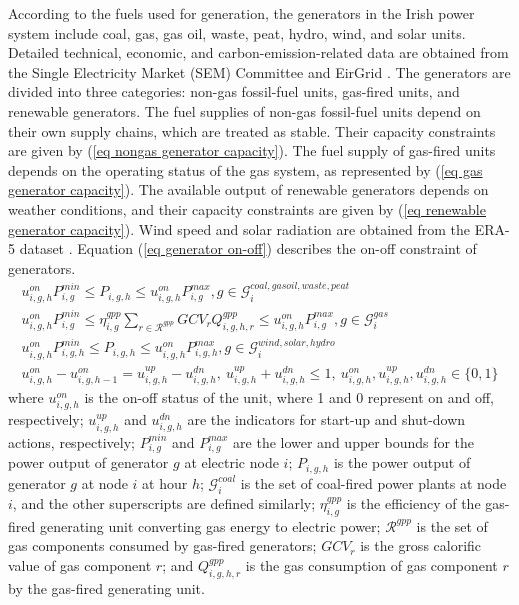 \documentclass[sn-mathphys,Numbered]{sn-jnl}%
\theoremstyle{plain}%
\theoremstyle{definition}%
\theoremstyle{remark}%
\begin{document}
According to the fuels used for generation, the generators in the Irish power system include coal, gas, gas oil, waste, peat, hydro, wind, and solar units. Detailed technical, economic, and carbon-emission-related data are obtained from the Single Electricity Market (SEM) Committee and EirGrid \cite{SEMPLEXOS, AllIslandTenYear}. The generators are divided into three categories: non-gas fossil-fuel units, gas-fired units, and renewable generators. The fuel supplies of non-gas fossil-fuel units depend on their own supply chains, which are treated as stable. Their capacity constraints are given by (\ref{eq nongas generator capacity}). The fuel supply of gas-fired units depends on the operating status of the gas system, as represented by (\ref{eq gas generator capacity}). The available output of renewable generators depends on weather conditions, and their capacity constraints are given by (\ref{eq renewable generator capacity}). Wind speed and solar radiation are obtained from the ERA-5 dataset \cite{ERA5}. Equation (\ref{eq generator on-off}) describes the on-off constraint of generators.
\begin{gather}
    u_{i,g,h}^{on} P_{i,g}^{min} \leq P_{i,g,h} \leq u_{i,g,h}^{on} P_{i,g}^{max}, g \in \mathcal{G}_i^{coal,gasoil,waste,peat}
\label{eq nongas generator capacity} \\
    u_{i,g,h}^{on} P_{i,g}^{min} \leq \eta_{i,g}^{gpp} \sum_{r \in \mathcal{R}^{gpp}} GCV_r Q_{i,g,h,r}^{gpp} \leq u_{i,g,h}^{on} P_{i,g}^{max}, g \in \mathcal{G}_i^{gas}
\label{eq gas generator capacity} \\
    u_{i,g,h}^{on} P_{i,g,h}^{min} \leq P_{i,g,h} \leq u_{i,g,h}^{on} P_{i,g,h}^{max}, g \in \mathcal{G}_i^{wind,solar,hydro}
\label{eq renewable generator capacity} \\
    u_{i,g,h}^{on} - u_{i,g,h-1}^{on} = u_{i,g,h}^{up} - u_{i,g,h}^{dn}, \ u_{i,g,h}^{up} + u_{i,g,h}^{dn} \leq 1, \ u_{i,g,h}^{on}, u_{i,g,h}^{up}, u_{i,g,h}^{dn} \in \{0,1\}
\label{eq generator on-off} 
\end{gather}
where $u_{i,g,h}^{on}$ is the on-off status of the unit, where 1 and 0 represent on and off, respectively; $u_{i,g,h}^{up}$ and $u_{i,g,h}^{dn}$ are the indicators for start-up and shut-down actions, respectively; $P_{i,g}^{min}$ and $P_{i,g}^{max}$ are the lower and upper bounds for the power output of generator $g$ at electric node $i$; $P_{i,g,h}$ is the power output of generator $g$ at node $i$ at hour $h$; $\mathcal{G}_i^{coal}$ is the set of coal-fired power plants at node $i$, and the other superscripts are defined similarly; $\eta_{i,g}^{gpp}$ is the efficiency of the gas-fired generating unit converting gas energy to electric power; $\mathcal{R}^{gpp}$ is the set of gas components consumed by gas-fired generators; $GCV_r$ is the gross calorific value of gas component $r$; and $Q_{i,g,h,r}^{gpp}$ is the gas consumption of gas component $r$ by the gas-fired generating unit.
\end{document}
